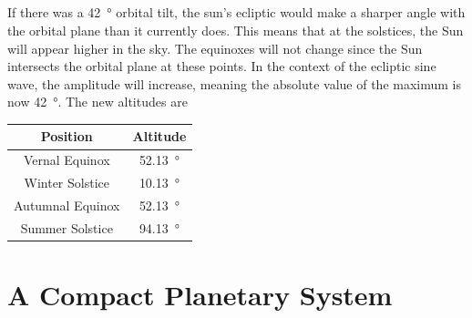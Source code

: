 \documentclass{article}
\begin{document}
\subsection{}

If there was a \SI{42}{\degree} orbital tilt, the sun's ecliptic would make a sharper angle with the orbital plane than it currently does.
This means that at the solstices, the Sun will appear higher in the sky.
The equinoxes will not change since the Sun intersects the orbital plane at these points.
In the context of the ecliptic sine wave, the amplitude will increase, meaning the absolute value of the maximum is now \SI{42}{\degree}.
The new altitudes are
\begin{center}
    \begin{tabular}{||c|c||}
        \hline
        Position & Altitude \\
        \hline
        Vernal Equinox & \SI{52.13}{\degree} \\
        Winter Solstice & \SI{10.13}{\degree} \\
        Autumnal Equinox & \SI{52.13}{\degree} \\
        Summer Solstice & \SI{94.13}{\degree} \\
        \hline
    \end{tabular}
\end{center}

\section{A Compact Planetary System}

\subsection{}
\end{document}

